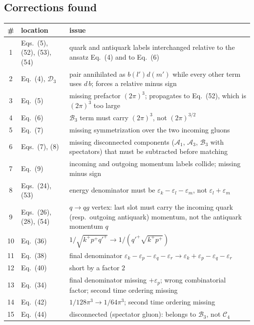 \documentclass[11pt]{article}
\newcommand{\eps}{\varepsilon}
\begin{document}
\subsection{Corrections found}

\begin{center}
\renewcommand{\arraystretch}{1.2}
\begin{longtable}{clp{9.4cm}}
\hline
\# & location & issue\\
\hline
\endhead
1 & Eqs.~(5), (52), (53), (54) & quark and antiquark labels interchanged relative to the
ansatz Eq.~(4) and to Eq.~(6)\\
2 & Eq.~(4), $\mathcal D_3$ & pair annihilated as $b(l')d(m')$ while every other term uses
$d\,b$; forces a relative minus sign\\
3 & Eq.~(5) & missing prefactor $(2\pi)^{3}$; propagates to Eq.~(52), which is
$(2\pi)^{3}$ too large\\
4 & Eq.~(6) & $\mathcal B_3$ term must carry $(2\pi)^{3}$, not $(2\pi)^{3/2}$\\
5 & Eq.~(7) & missing symmetrization over the two incoming gluons\\
6 & Eqs.~(7), (8) & missing disconnected components ($\mathcal A_1$, $\mathcal A_3$,
$\mathcal B_3$ with spectators) that must be subtracted before matching\\
7 & Eq.~(9) & incoming and outgoing momentum labels collide; missing minus sign\\
8 & Eqs.~(24), (53) & energy denominator must be $\eps_{k}-\eps_{l}-\eps_{m}$, not
$\eps_{l}+\eps_{m}$\\
9 & Eqs.~(26), (28), (54) & $q\to qg$ vertex: last slot must carry the incoming quark
(resp.\ outgoing antiquark) momentum, not the antiquark momentum $q$\\
10 & Eq.~(36) & $1/\sqrt{k^{+}p^{+}q'^{+}}\to 1/(q'^{+}\sqrt{k^{+}p^{+}})$\\
11 & Eq.~(38) & final denominator $\eps_{k}-\eps_{p}-\eps_{q}-\eps_{r}
\to\eps_{k}+\eps_{p}-\eps_{q}-\eps_{r}$\\
12 & Eq.~(40) & short by a factor $2$\\
13 & Eq.~(34) & final denominator missing $+\eps_{p}$; wrong combinatorial factor; second
time ordering missing\\
14 & Eq.~(42) & $1/128\pi^{3}\to1/64\pi^{3}$; second time ordering missing\\
15 & Eq.~(44) & disconnected (spectator gluon): belongs to $\mathcal B_3$, not $\mathcal C_4$\\

\end{longtable}
\end{center}
\end{document}
